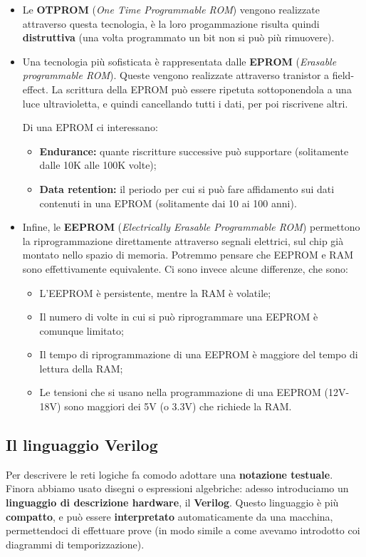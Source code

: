 \documentclass[a4paper,11pt]{article}
\begin{document}
\begin{itemize}
	\item Le \textbf{OTPROM} (\textit{One Time Programmable ROM}) vengono realizzate attraverso questa tecnologia, è la loro progammazione risulta quindi \textbf{distruttiva} (una volta programmato un bit non si può più rimuovere).
	\item  Una tecnologia più sofisticata è rappresentata dalle \textbf{EPROM} (\textit{Erasable programmable ROM}).
Queste vengono realizzate attraverso tranistor a field-effect.
La scrittura della EPROM può essere ripetuta sottoponendola a una luce ultravioletta, e quindi cancellando tutti i dati, per poi riscrivene altri.

Di una EPROM ci interessano:
\begin{itemize}
	\item \textbf{Endurance:} quante riscritture successive può supportare (solitamente dalle 10K alle 100K volte);
	\item \textbf{Data retention:} il periodo per cui si può fare affidamento sui dati contenuti in una EPROM (solitamente dai 10 ai 100 anni).
\end{itemize}
	\item Infine, le \textbf{EEPROM} (\textit{Electrically Erasable Programmable ROM}) permettono la riprogrammazione direttamente attraverso segnali elettrici, sul chip già montato nello spazio di memoria.
		Potremmo pensare che EEPROM e RAM sono effettivamente equivalente.
		Ci sono invece alcune differenze, che sono:
		\begin{itemize}
			\item L'EEPROM è persistente, mentre la RAM è volatile;
			\item Il numero di volte in cui si può riprogrammare una EEPROM è comunque limitato;
			\item Il tempo di riprogrammazione di una EEPROM è maggiore del tempo di lettura della RAM;
			\item Le tensioni che si usano nella programmazione di una EEPROM (12V-18V) sono maggiori dei 5V (o 3.3V) che richiede la RAM. 
		\end{itemize}
\end{itemize}

\subsection{Il linguaggio Verilog}
Per descrivere le reti logiche fa comodo adottare una \textbf{notazione testuale}.
Finora abbiamo usato disegni o espressioni algebriche: adesso introduciamo un \textbf{linguaggio di descrizione hardware}, il \textbf{Verilog}.
Questo linguaggio è più \textbf{compatto}, e può essere \textbf{interpretato} automaticamente da una macchina, permettendoci di effettuare prove (in modo simile a come avevamo introdotto coi diagrammi di temporizzazione).
\end{document}
